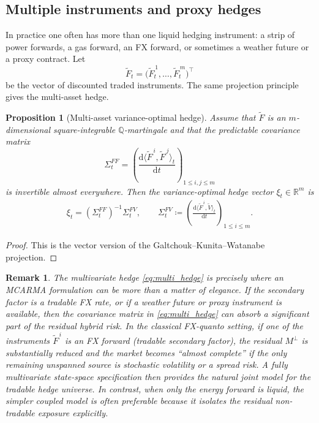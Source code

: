 \documentclass[10pt,reqno]{amsart}
\newtheorem{proposition}[theorem]{Proposition}
\newtheorem{remark}[theorem]{Remark}
\newcommand{\R}{\mathbb{R}}
\newcommand{\Q}{\mathbb{Q}}
\newcommand{\1}{\mathbbm{1}}
\newcommand{\dd}{\mathrm{d}}
\begin{document}
\subsection{Multiple instruments and proxy hedges}

In practice one often has more than one liquid hedging instrument: a strip of
power forwards, a gas forward, an FX forward, or sometimes a weather future or a
proxy contract. Let
$$
\widetilde{F}_t = \big(\widetilde{F}_t^{\,1},\dots,\widetilde{F}_t^{\,m}\big)^\top
$$
be the vector of discounted traded instruments. The same projection principle
gives the multi-asset hedge.

\begin{proposition}[Multi-asset variance-optimal hedge]
\label{prop:multi_hedge}
Assume that $\widetilde{F}$ is an $m$-dimensional square-integrable
$\Q$-martingale and that the predictable covariance matrix
$$
\Sigma_t^{FF}
= \left(
    \frac{\dd \langle \widetilde{F}^{\,i},\widetilde{F}^{\,j}\rangle_t}{\dd t}
  \right)_{1 \le i,j \le m}
$$
is invertible almost everywhere. Then the variance-optimal hedge vector
$\xi_t \in \R^m$ is
\begin{align}\label{eq:multi_hedge}
  \xi_t
  = (\Sigma_t^{FF})^{-1} \Sigma_t^{FV},
  \qquad
  \Sigma_t^{FV}
  \coloneqq \left(
    \frac{\dd \langle \widetilde{F}^{\,i},\widetilde{V}\rangle_t}{\dd t}
  \right)_{1 \le i \le m}.
\end{align}
\end{proposition}

\begin{proof}
This is the vector version of the Galtchouk--Kunita--Watanabe projection.
\end{proof}

\begin{remark}
The multivariate hedge \eqref{eq:multi_hedge} is precisely where an MCARMA
formulation can be more than a matter of elegance. If the secondary factor is a
tradable FX rate, or if a weather future or proxy instrument is available, then
the covariance matrix in \eqref{eq:multi_hedge} can absorb a significant part of
the residual hybrid risk. In the classical FX-quanto setting, if one of the
instruments $\widetilde{F}^{\,i}$ is an FX forward (tradable secondary factor),
the residual $M^{\perp}$ is substantially reduced and the market becomes
``almost complete'' if the only remaining unspanned source is stochastic
volatility or a spread risk. A fully multivariate state-space specification then
provides the natural joint model for the tradable hedge universe. In contrast,
when only the energy forward is liquid, the simpler coupled model is often
preferable because it isolates the residual non-tradable exposure explicitly.
\end{remark}
\end{document}
